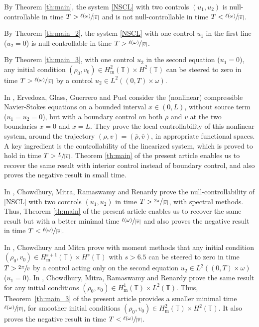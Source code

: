 \documentclass[10pt]{amsart}
\theoremstyle{plain}
\theoremstyle{definition}
\theoremstyle{remark}
\newcommand{\set}{\mathbb}
\newcommand{\T}{\set{T}}
\newcommand{\m}{{\mathrm m}}
\begin{document}
By Theorem \ref{th:main}, the system \eqref{NSCL} with two controls $(u_1,u_2)$ is null-controllable in time $T>\sfrac{\ell(\omega)}{|\overline{v}|}$ and is not null-controllable in time $T<\sfrac{\ell(\omega)}{|\overline{v}|}$.

By Theorem \ref{th:main_2}, the system \eqref{NSCL} with one control $u_1$ in the first line (\ie $u_2=0$) is null-controllable in time $T>\sfrac{\ell(\omega)}{|\overline{v}|}$.

By Theorem \ref{th:main_3}, with one control $u_2$ in the second equation (\ie $u_1=0$), any initial condition $(\rho_0,v_0)\in H^2_\m(\T)\times H^2(\T)$ can be steered to zero in time $T>\sfrac{\ell(\omega)}{|\overline{v}|}$ by a control $u_2 \in L^2((0,T)\times\omega)$.

In \cite{ervedoza_2012}, Ervedoza, Glass, Guerrero and Puel consider the (nonlinear) compressible Navier-Stokes equations on a bounded interval $x \in (0,L)$, without source term (\ie $u_1=u_2=0$), but with a boundary control on both $\rho$ and $v$ at the two boundaries $x=0$ and $x=L$. They prove the local controllability of this nonlinear system, around the trajectory $(\rho,v)=(\overline{\rho},\overline{v})$, in appropriate functional spaces. A key ingredient is the controllability of the linearized system, which is proved to hold in time $T>\sfrac{L}{|\overline{v}|}$. Theorem \ref{th:main} of the present article enables us to recover the same result with interior control instead of boundary control, and also proves the negative result in small time.

In \cite[Th.\,1.4]{chowdhury_2014}, Chowdhury, Mitra, Ramaswamy and Renardy prove the null-controllability of \eqref{NSCL} with two controls $(u_1,u_2)$ in time $T>\sfrac{2\pi}{|\overline{v}|}$, with spectral methods. Thus, Theorem \ref{th:main} of the present article enables us to recover the same result but with a better minimal time $\sfrac{\ell(\omega)}{|\overline{v}|}$ and also proves the negative result in time $T<\sfrac{\ell(\omega)}{|\overline{v}|}$.

In \cite[Th.\,1.3]{chowdhury_2015}, Chowdhury and Mitra prove with moment methods that any initial condition $(\rho_0,v_0)\in H^{s+1}_\m(\T)\times H^{s}(\mathbb{T})$ with $s> 6.5$ can be steered to zero in time $T>\sfrac{2\pi}{\overline{v}}$ by a control acting only on the second equation $u_2 \in L^2((0,T)\times\omega)$ (\ie $u_1=0$).
In \cite[Th.\,1.2]{chowdhury_2014}, Chowdhury, Mitra, Ramaswamy and Renardy prove the same result for any initial conditions $(\rho_0,v_0)\in H^1_\m(\T) \times L^2(\T)$. Thus, Theorem~\ref{th:main_3} of the present article provides a smaller minimal time $\sfrac{\ell(\omega)}{|\overline{v}|}$, for smoother initial conditions $(\rho_0,v_0)\in H^2_\m(\T)\times H^2(\T)$. It also proves the negative result in time $T<\nobreak\sfrac{\ell(\omega)}{|\overline{v}|}$.
\end{document}
